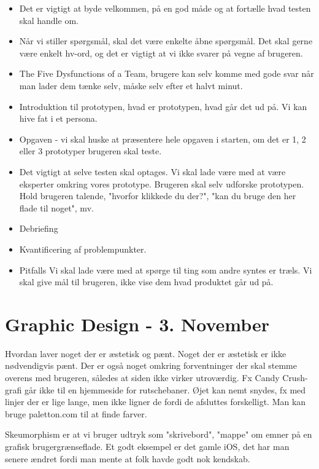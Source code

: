 \documentclass{article}
\begin{document}
\begin{itemize}
  \item Det er vigtigt at byde velkommen, på en god måde og at fortælle hvad
    testen skal handle om.
  \item Når vi stiller spørgsmål, skal det være enkelte åbne spørgsmål. Det skal
    gerne være enkelt hv-ord, og det er vigtigt at vi ikke svarer på vegne af
    brugeren.
  \item The Five Dysfunctions of a Team, brugere kan selv komme med gode svar
    når man lader dem tænke selv, måske selv efter et halvt minut. 
  \item Introduktion til prototypen, hvad er prototypen, hvad går det ud på. Vi
    kan hive fat i et persona. 
  \item Opgaven - vi skal huske at præsentere hele opgaven i starten, om det er
    1, 2 eller 3 prototyper brugeren skal teste.
  \item Det vigtigt at selve testen skal optages. Vi skal lade være med at være
    eksperter omkring vores prototype. Brugeren skal selv udforske prototypen.
    Hold brugeren talende, "hvorfor klikkede du der?", "kan du bruge den her
    flade til noget", mv.
  \item Debriefing
  \item Kvantificering af problempunkter. 
  \item Pitfalls
    \subitem Vi skal lade være med at spørge til ting som andre syntes er træls.
    Vi skal give mål til brugeren, ikke vise dem hvad produktet går ud på.
\end{itemize}

\newpage
\section{Graphic Design - 3. November} 
Hvordan laver noget der er æstetisk og pænt. Noget der er æstetisk er ikke
nødvendigvis pænt. Der er også noget omkring forventninger der skal stemme
overens med brugeren, således at siden ikke virker utroværdig. Fx Candy
Crush-grafi går ikke til en hjemmeside for rutschebaner.
Øjet kan nemt snydes, fx med linjer der er lige lange, men ikke ligner de fordi
de afsluttes forskelligt. Man kan bruge paletton.com til at finde farver. 

Skeumorphism er at vi bruger udtryk som "skrivebord", "mappe" om emner på en
grafisk brugergrænseflade. Et godt eksempel er det gamle iOS, det har man senere
ændret fordi man mente at folk havde godt nok kendskab.
\end{document}
